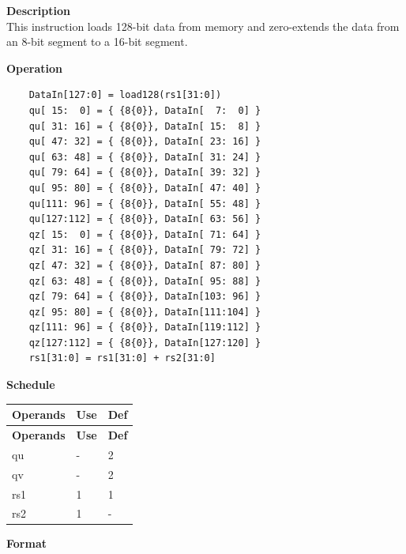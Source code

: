 \textbf{Description}\\
This instruction loads 128-bit data from memory and zero-extends the data from an 8-bit segment to a 16-bit segment.

\textbf{Operation}\\
\begin{lstlisting}
    DataIn[127:0] = load128(rs1[31:0])
    qu[ 15:  0] = { {8{0}}, DataIn[  7:  0] }
    qu[ 31: 16] = { {8{0}}, DataIn[ 15:  8] }
    qu[ 47: 32] = { {8{0}}, DataIn[ 23: 16] }
    qu[ 63: 48] = { {8{0}}, DataIn[ 31: 24] }
    qu[ 79: 64] = { {8{0}}, DataIn[ 39: 32] }
    qu[ 95: 80] = { {8{0}}, DataIn[ 47: 40] }
    qu[111: 96] = { {8{0}}, DataIn[ 55: 48] }
    qu[127:112] = { {8{0}}, DataIn[ 63: 56] }
    qz[ 15:  0] = { {8{0}}, DataIn[ 71: 64] }
    qz[ 31: 16] = { {8{0}}, DataIn[ 79: 72] }
    qz[ 47: 32] = { {8{0}}, DataIn[ 87: 80] }
    qz[ 63: 48] = { {8{0}}, DataIn[ 95: 88] }
    qz[ 79: 64] = { {8{0}}, DataIn[103: 96] }
    qz[ 95: 80] = { {8{0}}, DataIn[111:104] }
    qz[111: 96] = { {8{0}}, DataIn[119:112] }
    qz[127:112] = { {8{0}}, DataIn[127:120] }
    rs1[31:0] = rs1[31:0] + rs2[31:0]
\end{lstlisting}

\textbf{Schedule}\\
\begin{longtable}[c]{|l|l|l|}
    \hline
    \rowcolor{lightgray}
    \textbf{Operands} & \textbf{Use} & \textbf{Def} \\\hline
    \endfirsthead
    \hline
    \rowcolor{lightgray}
     \textbf{Operands} & \textbf{Use} & \textbf{Def} \\\hline
    \endhead
    \hline
    \endfoot

  qu & - & 2 \\\hline
  qv & - & 2 \\\hline
  rs1 & 1 & 1 \\\hline
    rs2 & 1 & -

\end{longtable}

\textbf{Format}\\

